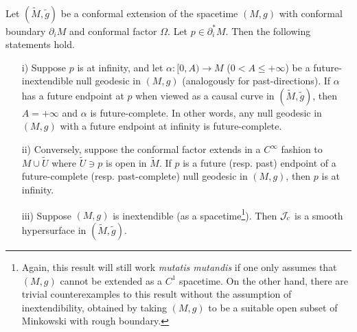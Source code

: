 \begin{theorem}
\label{conformalinfinity2}
Let $(\tilde{M},\tilde{g})$ be a conformal extension of the spacetime $(M,g)$ with conformal boundary $\partial_iM$ and conformal factor $\Omega$. Let $p \in \partial^{*}_iM$. Then the following statements hold.
\begin{itemize}
\item[i)] Suppose $p$ is at infinity, and let $\alpha:[0,A) \rightarrow M$ ($0<A \leq +\infty$) be a future-inextendible null geodesic in $(M,g)$ (analogously for past-directions). If $\alpha$ has a future endpoint at $p$ when viewed as a causal curve in $(\tilde{M}, \tilde{g})$, then $A=+\infty$ and $\alpha$ is future-complete. In other words, any null geodesic in $(M,g)$ with a future endpoint at infinity is future-complete.
\item[ii)] Conversely, suppose the conformal factor extends in a $C^{\infty}$ fashion to $M\cup \tilde{U}$ where $\tilde{U} \ni p$ is open in $\tilde{M}$. If $p$ is a future (resp. past) endpoint of a future-complete (resp. past-complete) null geodesic in $(M,g)$, then $p$ is at infinity.
\item[iii)] Suppose $(M,g)$ is inextendible (as a spacetime\footnote{Again, this result will still work {\em mutatis mutandis} if one only assumes that $(M,g)$ cannot be extended as a $C^1$ spacetime. On the other hand, there are trivial counterexamples to this result without the assumption of inextendibility, obtained by taking $(M,g)$ to be a suitable open subset of Minkowski with rough boundary.}). Then ${\cal J}_c$ is a smooth hypersurface in $(\tilde{M},\tilde{g})$.
\end{itemize}
\end{theorem}

